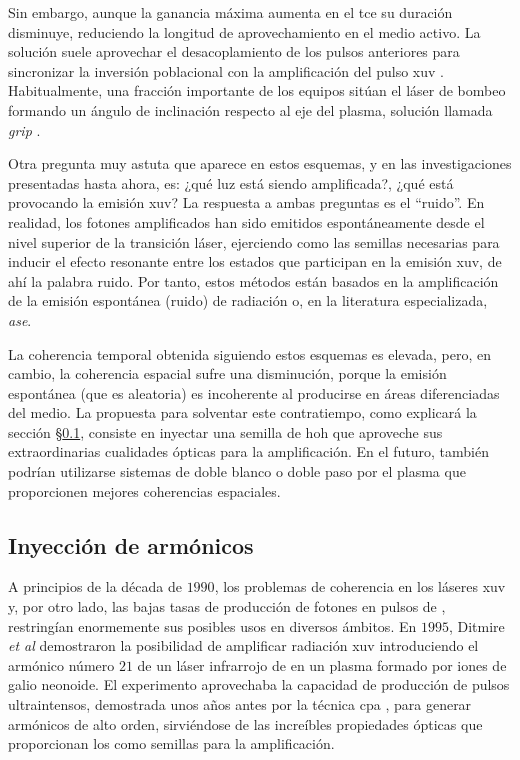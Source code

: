 Sin embargo, aunque la ganancia máxima aumenta en el \acrshort{tce} su duración disminuye, reduciendo la longitud de aprovechamiento en el medio activo. La solución suele aprovechar el desacoplamiento de los pulsos anteriores para sincronizar la inversión poblacional con la amplificación del pulso \acrshort{xuv} \autocite{Kozlova2020a}. Habitualmente, una fracción importante de los equipos sitúan el láser de bombeo formando un ángulo de inclinación respecto al eje del plasma, solución llamada \emph{\acrfull{grip}} \autocite{Keenan2005}.  

Otra pregunta muy astuta que aparece en estos esquemas, y en las investigaciones presentadas hasta ahora, es: ¿qué luz está siendo amplificada?, ¿qué está provocando la emisión \acrshort{xuv}? La respuesta a ambas preguntas es el \enquote{ruido}. En realidad, los fotones amplificados han sido emitidos espontáneamente desde el nivel superior de la transición láser, ejerciendo como las semillas necesarias para inducir el efecto resonante entre los estados que participan en la emisión \acrshort{xuv}, de ahí la palabra ruido. Por tanto, estos métodos están basados en la amplificación de la emisión espontánea (ruido) de radiación o, en la literatura especializada, \emph{\acrfull{ase}}.

La coherencia temporal obtenida siguiendo estos esquemas es elevada, pero, en cambio, la coherencia espacial sufre una disminución, porque la emisión espontánea (que es aleatoria) es incoherente al producirse en áreas diferenciadas del medio. La propuesta para solventar este contratiempo, como explicará la sección \S\ref{sec:1.4.1}, consiste en inyectar una semilla de \acrshort{hoh} que aproveche sus extraordinarias cualidades ópticas para la amplificación. En el futuro, también podrían utilizarse sistemas de doble blanco o doble paso por el plasma que proporcionen mejores coherencias espaciales.

\subsection{Inyección de armónicos}\label{sec:1.4.1}
A principios de la década de $1990$, los problemas de coherencia en los láseres \acrshort{xuv} y, por otro lado, las bajas tasas de producción de fotones en pulsos de , restringían enormemente sus posibles usos en diversos ámbitos. En $1995$, Ditmire \emph{et al} \autocite{Ditmire1995} demostraron la posibilidad de amplificar radiación \acrshort{xuv} introduciendo el armónico número $21$ de un láser infrarrojo de  en un plasma formado por iones de galio neonoide. El experimento aprovechaba la capacidad de producción de pulsos ultraintensos, demostrada unos años antes por la técnica \acrshort{cpa} \autocite{Maine1988}, para generar armónicos de alto orden, sirviéndose de las increíbles propiedades ópticas que proporcionan los  como semillas para la amplificación.

